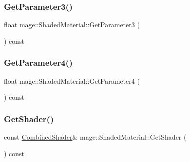 \hypertarget{structmage_1_1_shaded_material_a9af9a519df49114dc516b7f5057b1f4f}{}\label{structmage_1_1_shaded_material_a9af9a519df49114dc516b7f5057b1f4f} 
\subsubsection{\texorpdfstring{Get\+Parameter3()}{GetParameter3()}}
{\footnotesize\ttfamily float mage\+::\+Shaded\+Material\+::\+Get\+Parameter3 (\begin{DoxyParamCaption}{ }\end{DoxyParamCaption}) const\hspace{0.3cm}{\ttfamily [noexcept]}}

\hypertarget{structmage_1_1_shaded_material_a29197cc34b46b5b7bcd772dff7a894b6}{}\label{structmage_1_1_shaded_material_a29197cc34b46b5b7bcd772dff7a894b6} 
\subsubsection{\texorpdfstring{Get\+Parameter4()}{GetParameter4()}}
{\footnotesize\ttfamily float mage\+::\+Shaded\+Material\+::\+Get\+Parameter4 (\begin{DoxyParamCaption}{ }\end{DoxyParamCaption}) const\hspace{0.3cm}{\ttfamily [noexcept]}}

\hypertarget{structmage_1_1_shaded_material_a1d1affd63d0a2dd8543a10600a267e0b}{}\label{structmage_1_1_shaded_material_a1d1affd63d0a2dd8543a10600a267e0b} 
\subsubsection{\texorpdfstring{Get\+Shader()}{GetShader()}}
{\footnotesize\ttfamily const \hyperlink{structmage_1_1_combined_shader}{Combined\+Shader}\& mage\+::\+Shaded\+Material\+::\+Get\+Shader (\begin{DoxyParamCaption}{ }\end{DoxyParamCaption}) const\hspace{0.3cm}{\ttfamily [noexcept]}}

